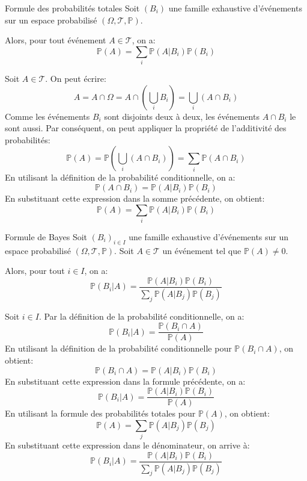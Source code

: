 \documentclass[a4paper, 12pt]{article}
\renewcommand*{\today}{21 January 2026}
\begin{document}
\hotbox{Probabilités 1}{CM 3}{\today}

\begin{theoreme}{Formule des probabilités totales}{}
    Soit $(B_i)$ une famille exhaustive d'événements sur un espace probabilisé $(\Omega, \mathcal{T}, \mathbb{P})$.
    
    Alors, pour tout événement $A \in \mathcal{T}$, on a:
    $$
        \mathbb{P}(A) = \sum_{i} \mathbb{P}(A | B_i) \mathbb{P}(B_i)
    $$
\end{theoreme}

\begin{demonstration}
    Soit $A \in \mathcal{T}$. On peut écrire:
    $$
        A = A \cap \Omega = A \cap \left( \bigcup_{i} B_i \right) = \bigcup_{i} (A \cap B_i)
    $$
    Comme les événements $B_i$ sont disjoints deux à deux, les événements $A \cap B_i$ le sont aussi. Par conséquent, on peut appliquer la propriété de l'additivité des probabilités:
    $$
        \mathbb{P}(A) = \mathbb{P}\left( \bigcup_{i} (A \cap B_i) \right) = \sum_{i} \mathbb{P}(A \cap B_i)
    $$
    En utilisant la définition de la probabilité conditionnelle, on a:
    $$
        \mathbb{P}(A \cap B_i) = \mathbb{P}(A | B_i) \mathbb{P}(B_i)
    $$
    En substituant cette expression dans la somme précédente, on obtient:
    $$
        \mathbb{P}(A) = \sum_{i} \mathbb{P}(A | B_i) \mathbb{P}(B_i)
    $$
\end{demonstration}

\begin{theoreme}{Formule de Bayes}{}
    Soit $(B_i)_{i \in I}$ une famille exhaustive d'événements sur un espace probabilisé $(\Omega, \mathcal{T}, \mathbb{P})$.
    Soit $A \in \mathcal{T}$ un événement tel que $\mathbb{P}(A) \neq 0$.

    Alors, pour tout $i \in I$, on a:
    $$
        \mathbb{P}(B_i | A) = \frac{\mathbb{P}(A | B_i) \mathbb{P}(B_i)}{\sum_{j} \mathbb{P}(A | B_j) \mathbb{P}(B_j)}
    $$
\end{theoreme}

\begin{demonstration}
    Soit $i \in I$. Par la définition de la probabilité conditionnelle, on a:
    $$
        \mathbb{P}(B_i | A) = \frac{\mathbb{P}(B_i \cap A)}{\mathbb{P}(A)}
    $$
    En utilisant la définition de la probabilité conditionnelle pour $\mathbb{P}(B_i \cap A)$, on obtient:
    $$
        \mathbb{P}(B_i \cap A) = \mathbb{P}(A | B_i) \mathbb{P}(B_i)
    $$
    En substituant cette expression dans la formule précédente, on a:
    $$
        \mathbb{P}(B_i | A) = \frac{\mathbb{P}(A | B_i) \mathbb{P}(B_i)}{\mathbb{P}(A)}
    $$
    En utilisant la formule des probabilités totales pour $\mathbb{P}(A)$, on obtient:
    $$
        \mathbb{P}(A) = \sum_{j} \mathbb{P}(A | B_j) \mathbb{P}(B_j)
    $$
    En substituant cette expression dans le dénominateur, on arrive à:
    $$
        \mathbb{P}(B_i | A) = \frac{\mathbb{P}(A | B_i) \mathbb{P}(B_i)}{\sum_{j} \mathbb{P}(A | B_j) \mathbb{P}(B_j)}
    $$
\end{demonstration}
\end{document}
